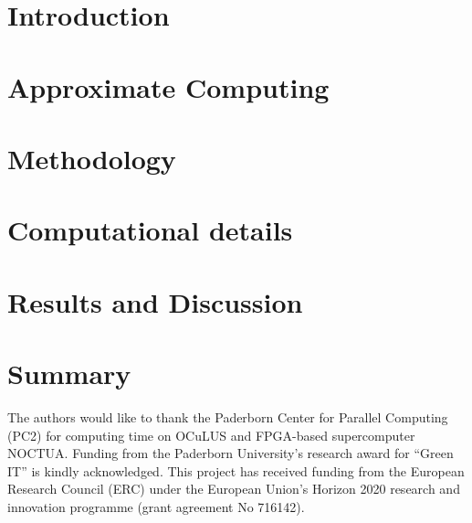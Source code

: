 \documentclass[aps,pre,twocolumn,showpacs,preprintnumbers,amsmath,amssymb]{revtex4-1}
\begin{document}
\section{Introduction}


\section{Approximate Computing}

%

\section{Methodology}

 
\section{Computational details}

 
\section{Results and Discussion}


\section{Summary}



\begin{acknowledgments}
The authors would like to thank the Paderborn Center for Parallel Computing (PC2) for computing time on OCuLUS and FPGA-based supercomputer NOCTUA. Funding from the Paderborn University's research award for ``Green IT'' is kindly acknowledged. This project has received funding from the European Research Council (ERC) under the European Union's Horizon 2020 research and innovation programme (grant agreement No 716142).
\end{acknowledgments}


\end{document}

